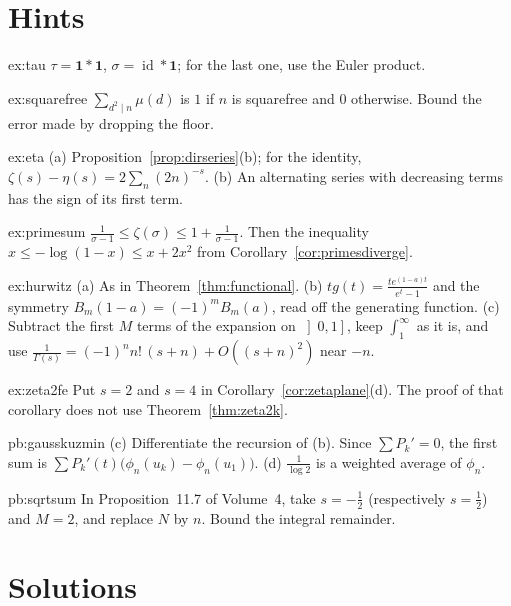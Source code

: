 \section{Hints}

\begin{hint}{ex:tau}
$\tau=\mathbf 1*\mathbf 1$, $\sigma=\operatorname{id}*\mathbf 1$; for the last one, use the Euler product.
\end{hint}
\begin{hint}{ex:squarefree}
$\sum_{d^2\mid n}\mu(d)$ is $1$ if $n$ is squarefree and $0$ otherwise. Bound the error made by dropping the floor.
\end{hint}
\begin{hint}{ex:eta}
(a) Proposition~\ref{prop:dirseries}(b); for the identity, $\zeta(s)-\eta(s)=2\sum_n(2n)^{-s}$. (b) An alternating series with decreasing terms has the sign of its
first term.
\end{hint}
\begin{hint}{ex:primesum}
$\frac1{\sigma-1}\le\zeta(\sigma)\le1+\frac1{\sigma-1}$. Then the inequality $x\le-\log(1-x)\le x+2x^2$ from Corollary~\ref{cor:primesdiverge}.
\end{hint}
\begin{hint}{ex:hurwitz}
(a) As in Theorem~\ref{thm:functional}. (b) $tg(t)=\frac{te^{(1-a)t}}{e^t-1}$ and the symmetry $B_m(1-a)=(-1)^mB_m(a)$, read off the generating function. (c) Subtract the first $M$
terms of the expansion on $\left]0,1\right]$, keep $\int_1^\infty$ as it is, and use $\frac1{\Gamma(s)}=(-1)^nn!\,(s+n)+O((s+n)^2)$ near $-n$.
\end{hint}
\begin{hint}{ex:zeta2fe}
Put $s=2$ and $s=4$ in Corollary~\ref{cor:zetaplane}(d). The proof of that corollary does not use Theorem~\ref{thm:zeta2k}.
\end{hint}

\begin{hint}{pb:gausskuzmin}
(c) Differentiate the recursion of (b). Since $\sum P_k'=0$, the first sum is $\sum P_k'(t)\bigl(\phi_n(u_k)-\phi_n(u_1)\bigr)$.
(d) $\frac1{\log2}$ is a weighted average of $\phi_n$.
\end{hint}

\begin{hint}{pb:sqrtsum}
In Proposition~11.7 of Volume~4, take $s=-\frac12$ (respectively $s=\frac12$) and $M=2$, and replace $N$ by $n$. Bound the integral remainder.
\end{hint}

\section{Solutions}

